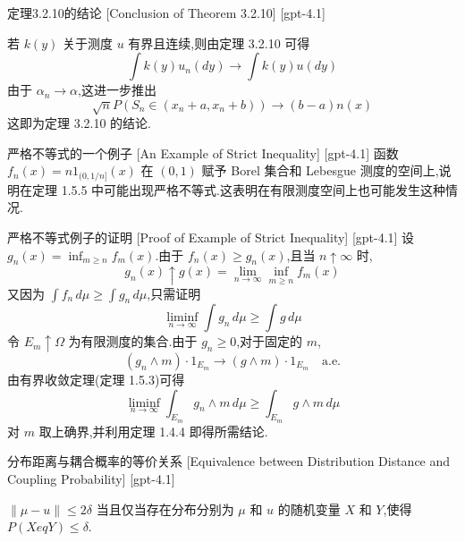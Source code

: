 \documentclass[UTF8]{ctexart}
\begin{document}
    
    
    \begin{thm}
        {定理3.2.10的结论}
        [Conclusion of Theorem 3.2.10]
        [gpt-4.1]
        
若 $k(y)$ 关于测度 $
u$ 有界且连续,则由定理 3.2.10 可得
\[
\int k ( y ) 
u _ { n } ( d y ) \to \int k ( y ) 
u ( d y )
\]
由于 $\alpha_n \to \alpha$,这进一步推出
\[
{\sqrt{n}} P ( S_n \in ( x_n + a , x_n + b ) ) \to ( b - a ) n(x)
\]
这即为定理 3.2.10 的结论.

    \end{thm}
    
    
    
    \begin{xmp}
        {严格不等式的一个例子}
        [An Example of Strict Inequality]
        [gpt-4.1]
        函数 $f_{n}(x) = n 1_{(0, 1/n]}(x)$ 在 $(0,1)$ 赋予 Borel 集合和 Lebesgue 测度的空间上,说明在定理 1.5.5 中可能出现严格不等式.这表明在有限测度空间上也可能发生这种情况.
    \end{xmp}
    
    
    
    \begin{prf}
        {严格不等式例子的证明}
        [Proof of Example of Strict Inequality]
        [gpt-4.1]
        设 $g_{n}(x) = \inf_{m \geq n} f_{m}(x)$.由于 $f_{n}(x) \geq g_{n}(x)$,且当 $n \uparrow \infty$ 时,
\[
g_{n}(x) \uparrow g(x) = \lim_{n \to \infty} \inf_{m \geq n} f_{m}(x)
\]
又因为 $\int f_{n} \, d\mu \geq \int g_{n} \, d\mu$,只需证明
\[
\liminf_{n \to \infty} \int g_{n} \, d\mu \geq \int g \, d\mu
\]
令 $E_{m} \uparrow \Omega$ 为有限测度的集合.由于 $g_{n} \geq 0$,对于固定的 $m$,
\[
(g_{n} \wedge m) \cdot 1_{E_{m}} \to (g \wedge m) \cdot 1_{E_{m}} \quad \mathrm{a.e.}
\]
由有界收敛定理(定理 1.5.3)可得
\[
\liminf_{n \to \infty} \int_{E_m} g_{n} \wedge m \, d\mu \geq \int_{E_m} g \wedge m \, d\mu
\]
对 $m$ 取上确界,并利用定理 1.4.4 即得所需结论.
    \end{prf}
    
    
    
    \begin{thm}
        {分布距离与耦合概率的等价关系}
        [Equivalence between Distribution Distance and Coupling Probability]
        [gpt-4.1]
        
$\| \mu - 
u \| \leq 2 \delta$ 当且仅当存在分布分别为 $\mu$ 和 $
u$ 的随机变量 $X$ 和 $Y$,使得 $P ( X 
eq Y ) \leq \delta$.

    \end{thm}
    
\end{document}
